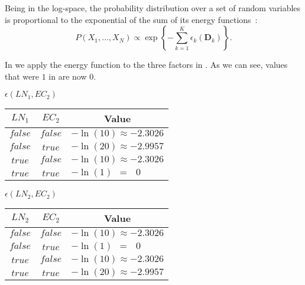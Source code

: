 Being in the log-space, the \gls{probability distribution} over a set of \glspl{random variable} is proportional to the exponential of the sum of its energy functions~\citep{koller2009probabilistic}:
\begin{equation}
  \label{equ:p-energy-function}
  P\left(X_1,\dots,X_N\right) \propto \exp\left\{-\sum_{k=1}^K\epsilon_k\left(\mathbf{D}_k\right)\right\}.
\end{equation}

In  we apply the \gls{energy function} to the three factors in .
As we can see, values that were $1$ in  are now $0$.

\begin{table}[t]
\begin{minipage}{0.5\linewidth}
\centering
$\epsilon(LN_1,EC_2)$\par
\smallskip
\begin{tabular}{c c l}
 \toprule
 $LN_1$ & $EC_2$ & \multicolumn{1}{c}{Value} \\
 \midrule
 $\mathit{false}$ & $\mathit{false}$ & $-\ln(10)\approx-2.3026$ \\
 $\mathit{false}$ & $\mathit{true}$ & $-\ln(20)\approx-2.9957$ \\
 $\mathit{true}$ & $\mathit{false}$ & $-\ln(10)\approx-2.3026$ \\
 $\mathit{true}$ & $\mathit{true}$ & $-\ln(1)\ \ =\ \ \ 0$ \\
 \bottomrule
\end{tabular}
\end{minipage}
\hfill
\begin{minipage}{0.5\linewidth}
\centering
$\epsilon(LN_2,EC_2)$\par
\smallskip
\begin{tabular}{c c l}
 \toprule
 $LN_2$ & $EC_2$ & \multicolumn{1}{c}{Value} \\
 \midrule
 $\mathit{false}$ & $\mathit{false}$ & $-\ln(10)\approx-2.3026$ \\
 $\mathit{false}$ & $\mathit{true}$ & $-\ln(1)\ \ = \ \ \ 0$ \\
 $\mathit{true}$ & $\mathit{false}$ & $-\ln(10)\approx-2.3026$ \\
 $\mathit{true}$ & $\mathit{true}$ & $-\ln(20)\approx-2.9957$ \\
 \bottomrule
\end{tabular}
\end{minipage}
\medskip
\begin{center}

\end{center}
\end{table}

